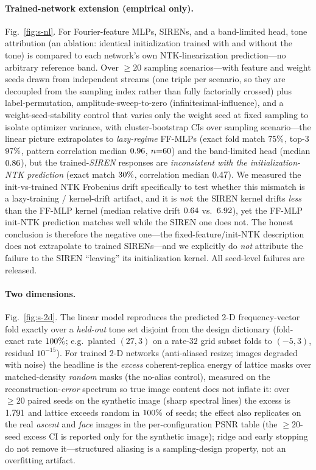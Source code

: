 \documentclass[10pt]{article}
\begin{document}
\paragraph{Trained-network extension (empirical only).}  Fig.~\ref{fig:s-nl}.  For
Fourier-feature MLPs, SIRENs, and a band-limited head, tone attribution (an ablation:
identical initialization trained with and without the tone) is compared to each network's
own NTK-linearization prediction---no arbitrary reference band.  Over $\ge20$ sampling
scenarios---with feature and weight seeds drawn from independent streams (one triple per
scenario, so they are decoupled from the sampling index rather than fully factorially
crossed) plus label-permutation, amplitude-sweep-to-zero (infinitesimal-influence), and a
weight-seed-stability control that varies only the weight seed at fixed sampling to isolate
optimizer variance, with cluster-bootstrap CIs over sampling scenario---the linear picture
extrapolates to \emph{lazy-regime} FF-MLPs (exact fold match $75\%$, top-3 $97\%$,
pattern correlation median $0.96$, $n{=}60$) and the band-limited head (median
$0.86$), but the trained-\emph{SIREN} responses are \emph{inconsistent with the
initialization-NTK prediction} (exact match $30\%$, correlation median $0.47$).
We measured the init-vs-trained NTK Frobenius drift specifically to test whether this
mismatch is a lazy-training / kernel-drift artifact, and it is \emph{not}: the SIREN kernel
drifts \emph{less} than the FF-MLP kernel (median relative drift $0.64$ vs.\
$6.92$), yet the FF-MLP init-NTK prediction matches well while the SIREN one does not.
The honest conclusion is therefore the negative one---the fixed-feature/init-NTK description
does not extrapolate to trained SIRENs---and we explicitly do \emph{not} attribute the
failure to the SIREN ``leaving'' its initialization kernel.  All seed-level failures are
released.

\paragraph{Two dimensions.}  Fig.~\ref{fig:s-2d}.  The linear model reproduces the
predicted 2-D frequency-vector fold exactly over a \emph{held-out} tone set disjoint from
the design dictionary (fold-exact rate $100\%$; e.g.\ planted $(27,3)$ on a rate-$32$ grid
subset folds to $(-5,3)$, residual $10^{-15}$).  For trained 2-D networks (anti-aliased
resize; images degraded with noise) the headline is the \emph{excess} coherent-replica
energy of lattice masks over matched-density \emph{random} masks (the no-alias control),
measured on the reconstruction-\emph{error} spectrum so true image content does not inflate
it: over $\ge20$ paired seeds on the synthetic image (sharp spectral lines) the excess is
$1.791$ and lattice exceeds random in $100\%$ of seeds; the effect also replicates on
the real \emph{ascent} and \emph{face} images in the per-configuration PSNR table (the
$\ge20$-seed excess CI is reported only for the synthetic image); ridge and early stopping
do not remove it---structured aliasing is a sampling-design property, not an overfitting
artifact.
\end{document}
